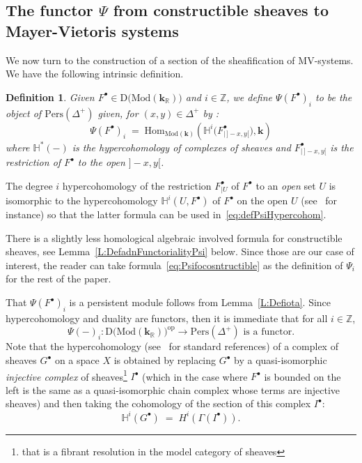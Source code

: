 \documentclass[a4paper, english, 11pt]{article}
\newcommand{\kk}[0]{\textbf{k}}
\newcommand{\Mod}[0]{\text{Mod}}
\newcommand{\0}{\vec{0}}
\newcommand{\Z}[0]{\mathbb{Z}}
\newcommand{\D}[0]{\text{D}}
\newcommand{\op}[0]{\text{op}}
\newcommand{\Hom}[0]{\text{Hom}}
\newcommand{\Pers}[0]{\text{Pers}}
\newtheorem{defi}[prop]{Definition}
\begin{document}
\subsection{ The functor $\Psi$ from constructible sheaves to Mayer-Vietoris systems}\label{SS:Psi}
We now turn to the construction of a section of the sheafification of MV-systems. We have the following intrinsic definition. 
\begin{defi}\label{def:Psi}Given $F^\bullet \in \D \big(\Mod(\kk_{\mathbb{R}})\big)$ and $i \in \Z$, we define  $\Psi(F^\bullet)_i$ to be the object of $\Pers(\Delta^+)$ given, for $(x,y)\in \Delta^+$ by :
\begin{equation}\label{eq:defPsiHypercohom}
 \Psi(F^\bullet)_i \; = \; \Hom_{\Mod(\kk)}\left ( \mathbb{H}^i\Big(F^\bullet_{|\, ]-x,y[}\Big), \kk\right)
\end{equation}
where $\mathbb{H}^*(-)$ is the hypercohomology of  complexes of sheaves and $F^\bullet_{|\, ]-x,y[}$ is the restriction of $F^\bullet$ to the open $]-x, y[$.  
\end{defi} 
The degree $i$ hypercohomology of the restriction $F^\bullet_{|U}$ of $F^\bullet$ to an \emph{open} set $U$ is isomorphic to the hypercohomology $\mathbb{H}^i(U,F^\bullet)$ of $F^\bullet$ on the open $U$ (see~\cite{Kash90} for instance) so that the latter formula can be used in~\eqref{eq:defPsiHypercohom}.

There is a slightly less homological algebraic involved formula for constructible sheaves, see Lemma~\ref{L:DefadnFunctorialityPsi} below.  Since
those are our case of interest, the reader can take  formula~\eqref{eq:Psifocosntructible} as the definition of $\Psi_i$ for the rest of the paper. 

\smallskip

That $\Psi(F^\bullet)_i$ is a persistent module follows from Lemma~\ref{L:Defiota}. Since hypercohomology and duality are functors, then it is immediate that for all $i\in \Z$,
\begin{equation}
 \Psi(-)_i: \D \big(\Mod(\kk_{\mathbb{R}})\big)^{\op} \longrightarrow \Pers(\Delta^+) \mbox{ is a functor.}
\end{equation}
 Note that the hypercohomology (see~\cite{DanilovHyperhomology, Tohoku} for standard references) of a complex of sheaves $G^\bullet$ on a space $X$ is obtained by replacing $G^\bullet$ by a quasi-isomorphic \emph{injective complex} of sheaves\footnote{that is a fibrant resolution in the model category of sheaves} $I^\bullet$ (which in the case where $F^\bullet$ is bounded on the left is the same as a quasi-isomorphic chain complex whose terms are injective sheaves) and then taking the cohomology of the section of this  complex $I^\bullet$: 
  $$\mathbb{H}^i(G^\bullet)\; =\; H^i( \Gamma(I^\bullet)) .$$
\end{document}
